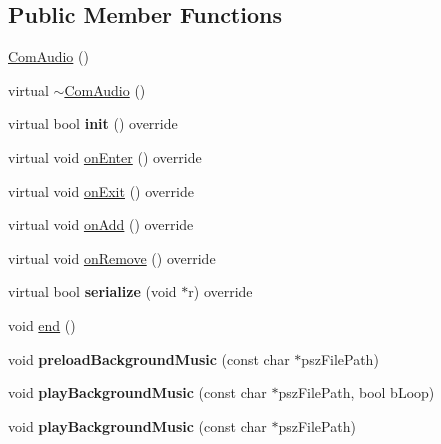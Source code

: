 \subsection*{Public Member Functions}
\begin{DoxyCompactItemize}
\item 
\hyperlink{classcocostudio_1_1ComAudio_a52e8c138f67b2e5c515056844337a7b1}{Com\+Audio} ()
\item 
virtual \hyperlink{classcocostudio_1_1ComAudio_a026dede72e07398e18e6d7990c7233da}{$\sim$\+Com\+Audio} ()
\item 
\mbox{\label{classcocostudio_1_1ComAudio_aa91879c75127be49059d5b33dce1d1bf}} 
virtual bool {\bfseries init} () override
\item 
virtual void \hyperlink{classcocostudio_1_1ComAudio_ad9dfe80b48c48e0d3a2c9aa697be8c68}{on\+Enter} () override
\item 
virtual void \hyperlink{classcocostudio_1_1ComAudio_a841e39267b4ba9cb56f35907d1f8cd7c}{on\+Exit} () override
\item 
virtual void \hyperlink{classcocostudio_1_1ComAudio_a62aa12d889d50b585ef9258bdabb6e3c}{on\+Add} () override
\item 
virtual void \hyperlink{classcocostudio_1_1ComAudio_a58b90fe44642cc06909fee2bc0b23f59}{on\+Remove} () override
\item 
\mbox{\label{classcocostudio_1_1ComAudio_afc2fcf94f57a59045633cf2d3a9cd6dc}} 
virtual bool {\bfseries serialize} (void $\ast$r) override
\item 
void \hyperlink{classcocostudio_1_1ComAudio_aa38fa3a5a6bfdfd2844b3b4514cebcb7}{end} ()
\item 
\mbox{\label{classcocostudio_1_1ComAudio_a890bccf01a5a2090a5055c48d0440c7b}} 
void {\bfseries preload\+Background\+Music} (const char $\ast$psz\+File\+Path)
\item 
\mbox{\label{classcocostudio_1_1ComAudio_a9576b5132ade431e75d14fb15c432db9}} 
void {\bfseries play\+Background\+Music} (const char $\ast$psz\+File\+Path, bool b\+Loop)
\item 
\mbox{\label{classcocostudio_1_1ComAudio_aab9b17bac41b047ab1415d90dc81ad8e}} 
void {\bfseries play\+Background\+Music} (const char $\ast$psz\+File\+Path)

\end{DoxyCompactItemize}
